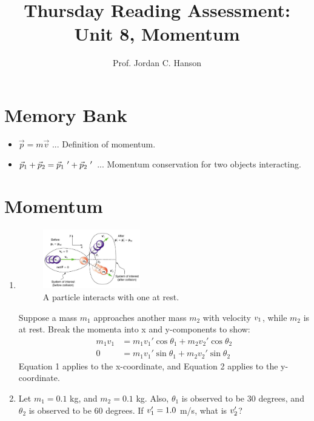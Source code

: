 \documentclass{article}
\begin{document}
\title{Thursday Reading Assessment: Unit 8, Momentum}
\author{Prof. Jordan C. Hanson}

\maketitle

\section{Memory Bank}

\begin{itemize}
\item $\vec{p} = m\vec{v}$ ... Definition of momentum.
\item $\vec{p}_{\rm 1} + \vec{p}_{\rm 2} = \vec{p}_{\rm 1}~' + \vec{p}_{\rm 2}~'$ ... Momentum conservation for two objects interacting.
\end{itemize}

\section{Momentum}

\begin{enumerate}
\item
\begin{figure}[ht]
\centering
\includegraphics[width=0.4\textwidth]{collision2.png}
\caption{\label{fig:collision} A particle interacts with one at rest.}
\end{figure}
Suppose a mass $m_1$ approaches another mass $m_2$ with velocity $v_{\rm 1}$, while $m_2$ is at rest.  Break the momenta into x and y-components to show:
\begin{align}
m_1 v_{1} &= m_1 v_{1}'\cos\theta_1 + m_2 v_{2}'\cos\theta_2 \\
0 &= m_1 v_{1}'\sin\theta_1 + m_2 v_{2}'\sin\theta_2
\end{align}
Equation 1 applies to the x-coordinate, and Equation 2 applies to the y-coordinate.  \\ \vspace{2cm}
\item Let $m_1 = 0.1$ kg, and $m_2 = 0.1$ kg.  Also, $\theta_1$ is observed to be 30 degrees, and $\theta_2$ is observed to be 60 degrees.  If $v_{\rm 1}' = 1.0$ m/s, what is $v_{\rm 2}'$?
\end{enumerate}
\end{document}
